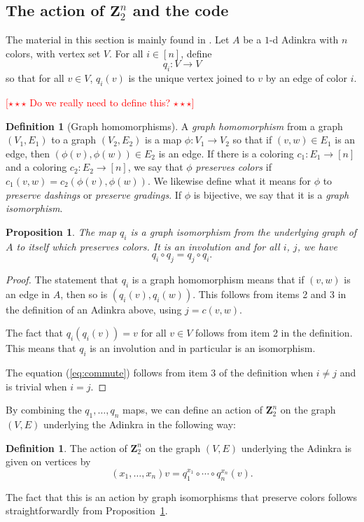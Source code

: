 \documentclass[12pt,twoside,singlespace]{article}
\numberwithin{equation}{section}
\newtheorem{prop}[equation]{Proposition}
\theoremstyle{definition}
\newtheorem{definition}[equation]{Definition}
\newcommand{\ZZ}{\mathbf{Z}}
\newcommand{\com}[1]{\textcolor{red}{$[\star \star \star$ #1 $\star \star \star]$}}
\begin{document}
\subsection{The action of $\ZZ_2^n$ and the code}
The material in this section is mainly found in \cite{d2l:omni,zhang:adinkras}.  Let $A$ be a $1$-d Adinkra with $n$ colors, with vertex set $V$.  For all $i\in [n]$, define
\[q_i:V\to V\]
so that for all $v\in V$, $q_i(v)$ is the unique vertex joined to $v$ by an edge of color $i$.

\com{Do we really need to define this?}
\begin{definition}[Graph homomorphisms]
\label{defn:homomorphism}
A \emph{graph homomorphism} from a graph $(V_1,E_1)$ to a graph $(V_2,E_2)$ is a map $\phi:V_1\to V_2$ so that if $(v,w)\in E_1$ is an edge, then $(\phi(v),\phi(w))\in E_2$ is an edge.  If there is a coloring $c_1:E_1\to [n]$ and a coloring $c_2:E_2\to [n]$, we say that $\phi$ \emph{preserves colors} if $c_1(v,w)=c_2(\phi(v),\phi(w))$.  We likewise define what it means for $\phi$ to \emph{preserve dashings} or \emph{preserve gradings}.  If $\phi$ is bijective, we say that it is a \emph{graph isomorphism}.
\end{definition}

\begin{prop}
\label{prop:qmap}
The map $q_i$ is a graph isomorphism from the underlying graph of $A$ to itself which preserves colors.  It is an involution and for all $i$, $j$, we have
\begin{equation}
q_i\circ q_j=q_j\circ q_i.\label{eq:commute}
\end{equation}
\end{prop}
\begin{proof}
The statement that $q_i$ is a graph homomorphism means that if $(v,w)$ is an edge in $A$, then so is $(q_i(v),q_i(w))$.  This follows from items 2 and 3 in the definition of an Adinkra above, using $j=c(v,w)$.

The fact that $q_i(q_i(v))=v$ for all $v\in V$ follows from item 2 in the definition.  This means that $q_i$ is an involution and in particular is an isomorphism.

The equation (\ref{eq:commute}) follows from item 3 of the definition when $i\not=j$ and is trivial when $i=j$.
\end{proof}

By combining the $q_1,\ldots, q_n$ maps, we can define an action of $\ZZ_2^n$ on the graph $(V,E)$ underlying the Adinkra in the following way:
\begin{definition}
The action of $\ZZ_2^n$ on the graph $(V,E)$ underlying the Adinkra is given on vertices by
\[(x_1,\ldots,x_n)v=q_1^{x_1}\circ\cdots\circ q_n^{x_n}(v).\]
\end{definition}
The fact that this is an action by graph isomorphisms that preserve colors follows straightforwardly from Proposition~\ref{prop:qmap}.
\end{document}

